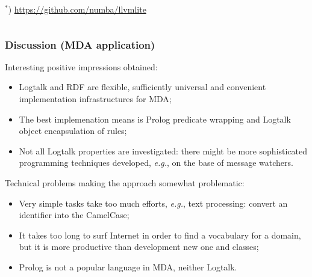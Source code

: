 \documentclass[10pt]{beamer}
\begin{document}
\begin{frame}[fragile]
\begin{columns}
\begin{column}{0.4\textwidth}
  ${}^*$) \url{https://github.com/numba/llvmlite}
    \end{column}
  \end{columns}
\end{frame}



\begin{frame}
  \frametitle{Discussion (MDA application)}
  Interesting positive impressions obtained:
  \begin{itemize}
  \item Logtalk and RDF are flexible, sufficiently universal and convenient implementation infrastructures for MDA;
  \item The best implemenation means is Prolog predicate wrapping and Logtalk object encapsulation of rules;
  \item Not all Logtalk properties are investigated: there might be more sophisticated programming techniques developed, \emph{e.g.}, on the base of message watchers.
  \end{itemize}
  Technical problems making the approach somewhat problematic:
  \begin{itemize}
  \item Very simple tasks take too much efforts, \emph{e.g.}, text processing: convert an identifier into the CamelCase;
  \item It takes too long to surf Internet in order to find a vocabulary for a domain, but it is more productive than development new one and classes;
  \item Prolog is not a popular language in MDA, neither Logtalk.
  \end{itemize}
\end{frame}
\end{document}
